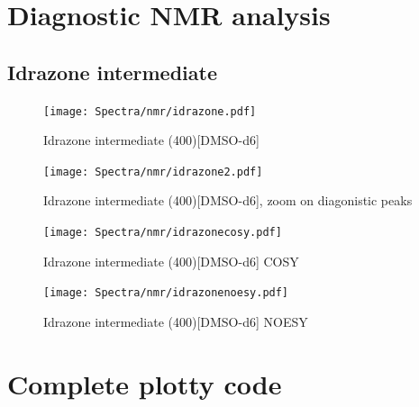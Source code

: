 \documentclass[../Master.tex]{subfiles}
\begin{document}
\chapter{Diagnostic NMR analysis}
\thispagestyle{empty}
\section{Idrazone intermediate}\label{ap:intermediate}
\begin{figure}[h!]
	\centering
	\texttt{[image: Spectra/nmr/idrazone.pdf]}
	\caption{Idrazone intermediate (400)[DMSO-d6]}
\end{figure}
\thispagestyle{empty}
\begin{figure}[h!]
	\centering
	\texttt{[image: Spectra/nmr/idrazone2.pdf]}
	\caption{Idrazone intermediate (400)[DMSO-d6], zoom on diagonistic peaks}
\end{figure}
\thispagestyle{empty}
\begin{figure}[h!]
	\centering
	\texttt{[image: Spectra/nmr/idrazonecosy.pdf]}
	\caption{Idrazone intermediate (400)[DMSO-d6] COSY}
\end{figure}
\thispagestyle{empty}
\begin{figure}[h!]
	\centering
	\texttt{[image: Spectra/nmr/idrazonenoesy.pdf]}
	\caption{Idrazone intermediate (400)[DMSO-d6] NOESY}
\end{figure}

\thispagestyle{empty}
\chapter{Complete plotty code}\label{ap:code}

\newline

\end{document}
